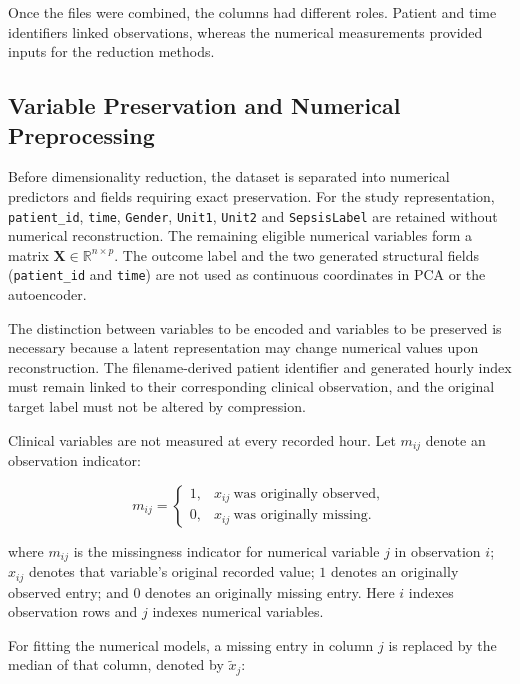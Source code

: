 \noindent Once the files were combined, the columns had different roles. Patient and time identifiers linked observations, whereas the numerical measurements provided inputs for the reduction methods.

\subsection{Variable Preservation and Numerical Preprocessing}\label{variable-preservation-and-numerical-preprocessing}

Before dimensionality reduction, the dataset is separated into numerical
predictors and fields requiring exact preservation. For the study
representation, \texttt{patient\_id}, \texttt{time}, \texttt{Gender},
\texttt{Unit1}, \texttt{Unit2} and \texttt{SepsisLabel} are retained
without numerical reconstruction. The remaining eligible numerical
variables form a matrix \(\boldsymbol{X}\in\mathbb{R}^{n\times p}\). The
outcome label and the two generated structural fields
(\texttt{patient\_id} and \texttt{time}) are not used as continuous
coordinates in PCA or the autoencoder.

\noindent The distinction between variables to be encoded and variables to be
preserved is necessary because a latent representation may change
numerical values upon reconstruction. The filename-derived patient
identifier and generated hourly index must remain linked to their
corresponding clinical observation, and the original target label must
not be altered by compression.

\noindent Clinical variables are not measured at every recorded hour. Let
\(m_{ij}\) denote an observation indicator:

\[
m_{ij}=
\begin{cases}
	1,&x_{ij}\ \text{was originally observed},\\
	0,&x_{ij}\ \text{was originally missing}.
\end{cases}\tag{3.3.1}
\]

\noindent where \(m_{ij}\) is the missingness indicator for numerical variable
\(j\) in observation \(i\); \(x_{ij}\) denotes that variable's original
recorded value; \(1\) denotes an originally observed entry; and \(0\)
denotes an originally missing entry. Here \(i\) indexes observation rows
and \(j\) indexes numerical variables.

\noindent For fitting the numerical models, a missing entry in column \(j\) is
replaced by the median of that column, denoted by \(\tilde{x}_j\):

